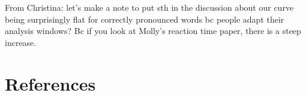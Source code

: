 \documentclass[man]{apa6}
\theoremstyle{definition}
\theoremstyle{definition}
\theoremstyle{definition}
\theoremstyle{remark}
\begin{document}
From Christina: let's make a note to put sth in the discussion about our
curve being surprisingly flat for correctly pronounced words bc people
adapt their analysis windows? Bc if you look at Molly's reaction time
paper, there is a steep increase.

\newpage

\section{References}\label{references}

\begingroup
\setlength{\parindent}{-0.5in} \setlength{\leftskip}{0.5in}

\hypertarget{refs}{}

\endgroup
\end{document}
